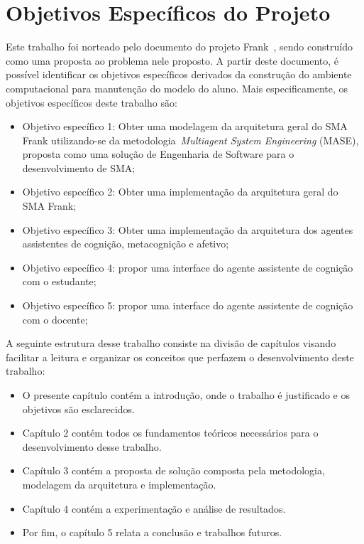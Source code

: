 \section{Objetivos Específicos do Projeto}
Este trabalho foi norteado pelo documento do projeto Frank~\cite{editalFrank}, sendo construído como uma proposta ao problema nele proposto. A partir deste documento, é possível identificar os objetivos específicos derivados da construção do ambiente computacional para manutenção do modelo do aluno. Mais especificamente, os objetivos específicos deste trabalho são:
 \begin{itemize}
 	\item Objetivo específico 1: Obter uma modelagem da arquitetura geral do SMA Frank utilizando-se da metodologia~\emph{Multiagent System Engineering} (MASE), proposta como uma solução de Engenharia de Software para o desenvolvimento de SMA;
	\item Objetivo específico 2: Obter uma implementação da arquitetura geral do SMA Frank;
	\item Objetivo específico 3: Obter uma implementação da arquitetura dos agentes assistentes de cognição, metacognição e afetivo;
	\item Objetivo específico 4: propor uma interface do agente assistente de cognição com o estudante;
	\item Objetivo específico 5: propor uma interface do agente assistente de cognição com o docente;
\end{itemize}

A seguinte estrutura desse trabalho consiste na divisão de capítulos visando facilitar a leitura e organizar os conceitos que perfazem o desenvolvimento deste trabalho:
\begin{itemize}
	\item O presente capítulo contém a introdução, onde o trabalho é justificado e os objetivos são esclarecidos.
	\item Capítulo 2 contém todos os fundamentos teóricos necessários para o desenvolvimento desse trabalho.
	\item Capítulo 3 contém a proposta de solução composta pela metodologia, modelagem da arquitetura e implementação.
	\item Capítulo 4 contém a experimentação e análise de resultados.
	\item Por fim, o capítulo 5 relata a conclusão e trabalhos futuros.
\end{itemize}
